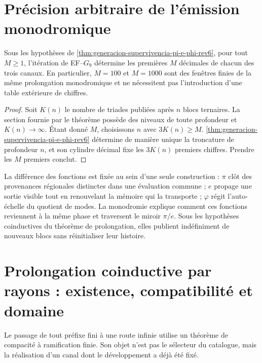 \section{Précision arbitraire de l'émission monodromique}
\label{sec:precision-arbitraria-monodromia-rev6}

\begin{corollary}
\label{cor:precision-arbitraria-monodromia-rev6}
Sous les hypothèses de
\cref{thm:generacion-supervivencia-pi-e-phi-rev6}, pour tout \(M\geq1\),
l'itération de EF--\(G_9\) détermine les premières
\(M\) décimales de chacun des trois canaux. En particulier, \(M=100\)
et \(M=1000\) sont des fenêtres finies de la même prolongation monodromique et ne
nécessitent pas l'introduction d'une table extérieure de chiffres.
\end{corollary}

\begin{proof}
Soit \(K(n)\) le nombre de triades publiées après \(n\) blocs
ternaires. La section fournie par le théorème possède des niveaux de toute
profondeur et \(K(n)\to\infty\). Étant donné \(M\),
choisissons \(n\) avec \(3K(n)\geq M\).
\cref{thm:generacion-supervivencia-pi-e-phi-rev6} détermine de manière unique
la troncature de profondeur \(n\), et son cylindre décimal fixe les
\(3K(n)\) premiers chiffres. Prendre les \(M\) premiers conclut.
\end{proof}

La différence des fonctions est fixée au sein d'une seule construction :
\(\pi\) clôt des provenances régionales distinctes dans une évaluation commune ;
\(e\) propage une sortie visible tout en renouvelant la mémoire qui la
transporte ; \(\varphi\) régit l'auto-échelle du quotient de modes. La
monodromie explique comment ces fonctions reviennent à la même phase et traversent
le miroir \(\pi/e\). Sous les hypothèses coinductives du théorème de
prolongation, elles publient indéfiniment de nouveaux blocs sans réinitialiser leur
histoire.

\ifdefined\HMTIncludeTargetFedRay
\section{Prolongation coinductive par rayons : existence, compatibilité et domaine}
\label{sec:rayo-coinductivo-rev6}

Le passage de tout préfixe fini à une route infinie utilise un théorème de
compacité à ramification finie. Son objet n'est pas le sélecteur du catalogue,
mais la réalisation d'un canal dont le développement a déjà été fixé.

